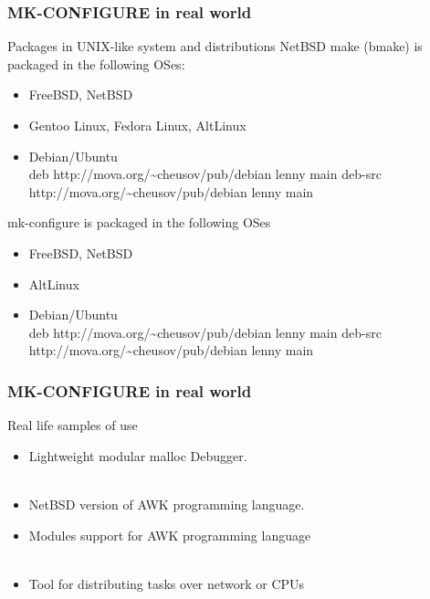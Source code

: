 \documentclass[hyperref={colorlinks=true}]{beamer}
\begin{document}

\begin{frame}[fragile,t]
  \frametitle{MK-CONFIGURE in real world}
  \begin{block}{Packages in UNIX-like system and distributions}
    NetBSD make (bmake) is packaged in the following OSes:
    \begin{itemize}
    \item FreeBSD, NetBSD
    \item Gentoo Linux, Fedora Linux, AltLinux
    \item Debian/Ubuntu\\
      deb http://mova.org/\~{}cheusov/pub/debian lenny main
      deb-src http://mova.org/\~{}cheusov/pub/debian lenny main
    \end{itemize}
    mk-configure is packaged in the following OSes
    \begin{itemize}
    \item FreeBSD, NetBSD
    \item AltLinux
    \item Debian/Ubuntu\\
      deb http://mova.org/\~{}cheusov/pub/debian lenny main
      deb-src http://mova.org/\~{}cheusov/pub/debian lenny main
    \end{itemize}
  \end{block}
\end{frame}


\begin{frame}[fragile,t]
  \frametitle{MK-CONFIGURE in real world}
  \begin{block}{Real life samples of use}
  \begin{itemize}
  \item Lightweight modular malloc Debugger.\\
    \\
  \item NetBSD version of AWK programming language.\\
  \item Modules support for AWK programming language\\
    \\
  \item Tool for distributing tasks over network or CPUs\\
    \\
  \end{itemize}
  \end{block}
\end{frame}
\end{document}
